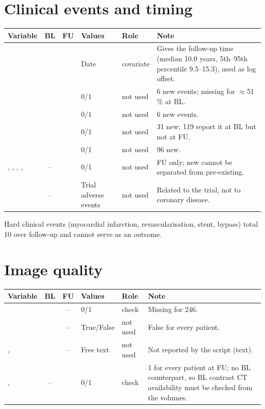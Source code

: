 \documentclass[11pt,a4paper]{article}
\newcommand{\yes}{\checkmark}
\newcommand{\no}{--}
\begin{document}
\section{Clinical events and timing}

\begin{longtable}{L{4.3cm} c c L{6.2cm} L{2.2cm} L{7.0cm}}
\toprule
Variable & BL & FU & Values & Role & Note \\
\midrule
\endhead
{} & \yes & \yes & Date & covariate &
  Gives the follow-up time (median 10.0 years, 5th--95th percentile 9.5--15.3), used as log offset. \\
 & \yes & \yes & 0/1 & not used & 6 new events; missing for $\approx$51\,\% at BL. \\
 & \yes & \yes & 0/1 & not used & 6 new events. \\
 & \yes & \yes & 0/1 & not used & 31 new; 119 report it at BL but not at FU. \\
 & \yes & \yes & 0/1 & not used & 96 new. \\
, , , ,  & \no & \yes & 0/1 & not used &
  FU only; new cannot be separated from pre-existing. \\
 & \no & \yes & Trial adverse events & not used & Related to the trial, not to coronary disease. \\
\bottomrule
\end{longtable}

\noindent Hard clinical events (myocardial infarction, revascularisation, stent, bypass) total 10 over follow-up
and cannot serve as an outcome.

\section{Image quality}

\begin{longtable}{L{4.3cm} c c L{6.2cm} L{2.2cm} L{7.0cm}}
\toprule
Variable & BL & FU & Values & Role & Note \\
\midrule
\endhead
{} & \yes & \no & 0/1 & check & Missing for 246. \\
 & \yes & \no & True/False & not used & False for every patient. \\
,  & \yes & \no & Free text & not used & Not reported by the script (text). \\
,  & \no & \yes & 0/1 & check &
  1 for every patient at FU; no BL counterpart, so BL contrast CT availability must be checked from the volumes. \\
\bottomrule
\end{longtable}
\end{document}
